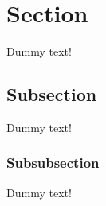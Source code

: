 \documentclass{article}
\begin{document}
\tableofcontents
\newpage

\section{Section}
Dummy text!

\subsection{Subsection}
Dummy text!

\subsubsection{Subsubsection}
Dummy text!
\end{document}
